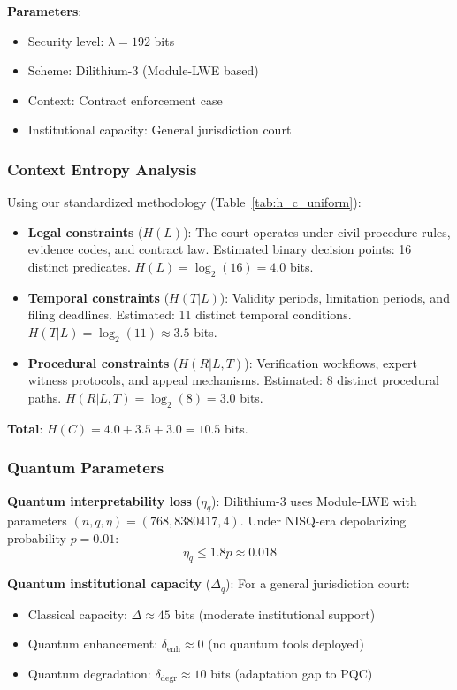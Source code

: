 \documentclass{ieeeaccess}
\begin{document}
\textbf{Parameters}:
\begin{itemize}
    \item Security level: $\lambda = 192$ bits
    \item Scheme: Dilithium-3 (Module-LWE based)
    \item Context: Contract enforcement case
    \item Institutional capacity: General jurisdiction court
\end{itemize}

\subsubsection{Context Entropy Analysis}

Using our standardized methodology (Table~\ref{tab:h_c_uniform}):

\begin{itemize}
    \item \textbf{Legal constraints} ($H(L)$): The court operates under civil procedure rules, evidence codes, and contract law. Estimated binary decision points: 16 distinct predicates. $H(L) = \log_2(16) = 4.0$ bits.

    \item \textbf{Temporal constraints} ($H(T|L)$): Validity periods, limitation periods, and filing deadlines. Estimated: 11 distinct temporal conditions. $H(T|L) = \log_2(11) \approx 3.5$ bits.

    \item \textbf{Procedural constraints} ($H(R|L,T)$): Verification workflows, expert witness protocols, and appeal mechanisms. Estimated: 8 distinct procedural paths. $H(R|L,T) = \log_2(8) = 3.0$ bits.
\end{itemize}

\textbf{Total}: $H(C) = 4.0 + 3.5 + 3.0 = 10.5$ bits.

\subsubsection{Quantum Parameters}

\textbf{Quantum interpretability loss} ($\eta_q$): Dilithium-3 uses Module-LWE with parameters $(n, q, \eta) = (768, 8380417, 4)$. Under NISQ-era depolarizing probability $p = 0.01$:
\begin{equation}
    \eta_q \leq 1.8p \approx 0.018
\end{equation}

\textbf{Quantum institutional capacity} ($\Delta_q$): For a general jurisdiction court:
\begin{itemize}
    \item Classical capacity: $\Delta \approx 45$ bits (moderate institutional support)
    \item Quantum enhancement: $\delta_{\text{enh}} \approx 0$ (no quantum tools deployed)
    \item Quantum degradation: $\delta_{\text{degr}} \approx 10$ bits (adaptation gap to PQC)
\end{itemize}
\end{document}
